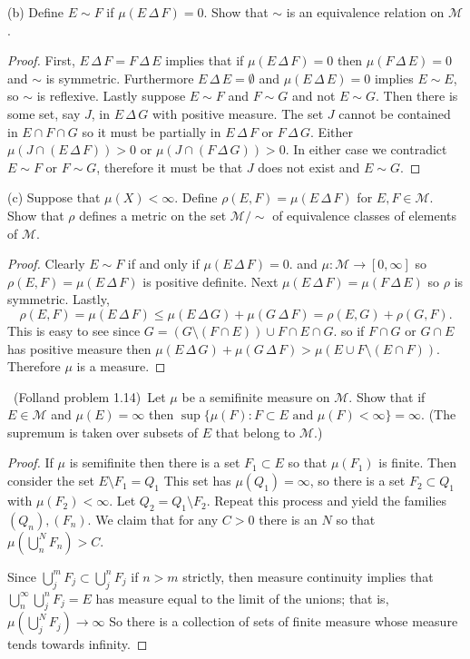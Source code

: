 \documentclass[11pt]{amsart}
\def\symdif{\,\Delta\,}
\def\scriptm{{\mathcal M}}
\begin{document}
(b) Define $E\sim F$ if $\mu(E\symdif F)=0$.
Show that $\sim$ is an equivalence relation on $\scriptm$.
\begin{proof}
	First, $E \symdif F = F \symdif E$ implies that if $\mu(E \symdif F) = 0$ then $\mu(F \symdif E) = 0$ and $\sim$ is symmetric. Furthermore $E \symdif E = \emptyset$ and $\mu(E \symdif E) = 0 $ implies $ E \sim E$, so $\sim$ is reflexive. Lastly suppose $E \sim F$ and $F \sim G$  and not $E \sim G$. Then there is some set, say $J$, in $E \symdif G$ with positive measure. The set $J$ cannot be contained in $E \cap F \cap G$ so it must be partially in $E \symdif F$ or $F \symdif G$. Either $\mu(J \cap (E \symdif F)) > 0$ or $\mu(J \cap (F \symdif G)) > 0$. In either case we contradict $E \sim F$ or $F\sim G$, therefore it must be that $J$ does not exist and $E \sim G$.
\end{proof}

(c) Suppose that $\mu(X)<\infty$. Define $\rho(E,F) = \mu(E\symdif F)$ for $E,F\in\scriptm$.
Show that $\rho$ defines a metric on the set $\scriptm/\sim$ of equivalence
classes of elements of $\scriptm$.
\begin{proof}
	Clearly $E \sim F$ if and only if $\mu(E \symdif F) = 0$. and $\mu: \scriptm \to [0, \infty]$ so $\rho(E,F) = \mu(E \symdif F)$ is  positive definite. Next $\mu(E \symdif F) = \mu(F \symdif E)$ so $\rho$ is symmetric. Lastly, 
	\begin{equation*}
		\rho(E,F) = \mu(E \symdif F) \leq \mu(E \symdif G) + \mu(G\symdif F) = \rho(E,G) + \rho(G,F).
	\end{equation*}
	This is easy to see since $G = (G \setminus (F \cap E)) \cup F \cap E \cap G.$ so if $F \cap G$ or $G \cap E$ has positive measure then $\mu(E \symdif G) + \mu(G\symdif F)  > \mu(E \cup F \setminus(E \cap F)).$ Therefore $\mu$ is a measure.
\end{proof}

\medskip {}\ 
(Folland problem 1.14)\
Let $\mu$ be a semifinite measure on $\scriptm$.
Show that if $E\in\scriptm$ and $\mu(E)=\infty$
then $\sup\{\mu(F): F\subset E \text{ and } \mu(F)<\infty \}=\infty$.
(The supremum is taken over subsets of $E$ that belong to $\scriptm$.)
\begin{proof}
	If $\mu$ is semifinite then there is a set $F_1 \subset E$ so that $\mu(F_1)$ is finite. Then consider the set $E \setminus F_1 = Q_1$ This set has $\mu(Q_1) = \infty$, so there is a set $F_2 \subset Q_1$ with $\mu(F_2) < \infty$.  Let $Q_2 = Q_1 \setminus F_2$. Repeat this process and yield the families $(Q_n), (F_n)$. We claim that for any $C > 0$ there is an $N$ so that $\mu\left(\bigcup_n^N F_n\right) > C. $  

	Since $\bigcup_j^m F_j \subset \bigcup_j^n F_j$ if $n > m$ strictly, then measure continuity implies that $\bigcup_n^\infty \bigcup_j^n F_j = E$ has measure equal to the limit of the unions; that is, $\mu\left(\bigcup_j^NF_j\right) \to \infty$ So there is a collection of sets of finite measure whose measure tends towards infinity.
\end{proof}
\end{document}
